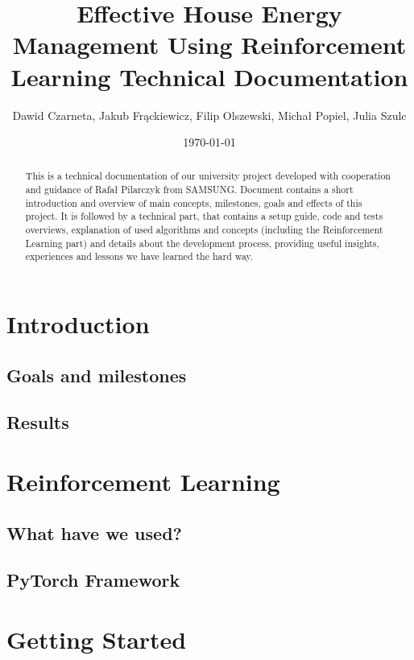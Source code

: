 \documentclass{article}
\title{Effective House Energy Management Using Reinforcement Learning Technical Documentation} %
\author{Dawid Czarneta, Jakub Frąckiewicz, Filip Olszewski, Michał Popiel, Julia Szulc}
\date{\today}
\begin{document}
\maketitle %

\begin{abstract}
This is a technical documentation of our university project developed with cooperation and
guidance of Rafał Pilarczyk from SAMSUNG. Document contains a short introduction and overview of main concepts, milestones, goals and effects of this project. It is followed by a technical part, that contains a setup guide, code and tests overviews, explanation of used algorithms and concepts (including the Reinforcement Learning part) and details about the development process, providing useful insights, experiences and lessons we have learned the hard way.
\end{abstract}

\section{Introduction}
\subsection{Goals and milestones}
\subsection{Results}

\section{Reinforcement Learning}
\subsection{What have we used?}
\subsection{PyTorch Framework}
\section{Getting Started}
\end{document}
